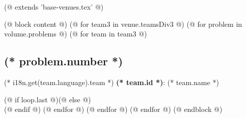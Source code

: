 (@ extends 'base-venues.tex' @)

(@ block content @)
    \pagestyle{tearoff}    
    (@ for team3 in venue.teamsDiv3 @)
        (@ for problem in volume.problems @)
            (@ for team in team3 @)%
                \setcounter{volume}{(* volume.number *)}%
                \setcounter{problem}{(* problem.number *)}%
                \setcounter{team}{(* team.id *)}%
                \begin{minipage}[t][91mm][t]{\textwidth}%
                    \begin{minipage}[t][81mm][t]{0.875\linewidth}\vspace{0pt}%
                        \subsection{(* problem.number *)}%
                        \setlength{\parskip}{6pt}
                    \end{minipage}%
                    \begin{minipage}[t][81mm][t]{0.125\linewidth}\vspace{0pt}%
                        \hspace{2mm}
                        \hspace{1mm}
                    \end{minipage}
                    {\small (* i18n.get(team.language).team *) \textbf{(* team.id *)}: (* team.name *)}
                \end{minipage}%
                (@ if loop.last @)\newpage(@ else @)\\(@ endif @)
            (@ endfor @)
        (@ endfor @)
    (@ endfor @)
(@ endblock @)

